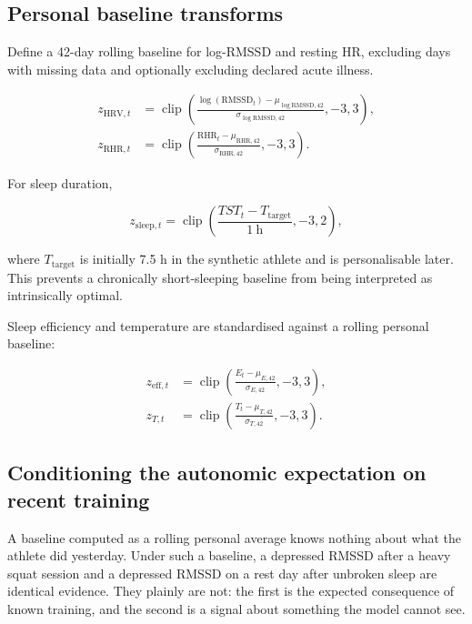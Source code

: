 \documentclass[11pt]{article}
\begin{document}
\subsection{Personal baseline transforms}

Define a 42-day rolling baseline for log-RMSSD and resting HR, excluding days with missing data and optionally excluding declared acute illness.

\begin{align}
z_{\mathrm{HRV},t}&=\operatorname{clip}\left(\frac{\log(\mathrm{RMSSD}_t)-\mu_{\log \mathrm{RMSSD},42}}{\sigma_{\log \mathrm{RMSSD},42}},-3,3\right),\\
z_{\mathrm{RHR},t}&=\operatorname{clip}\left(\frac{\mathrm{RHR}_t-\mu_{\mathrm{RHR},42}}{\sigma_{\mathrm{RHR},42}},-3,3\right).
\end{align}

For sleep duration,

\begin{equation}
z_{\mathrm{sleep},t}=\operatorname{clip}\left(\frac{TST_t-T_{\mathrm{target}}}{1\ \mathrm{h}},-3,2\right),
\end{equation}

where $T_{\mathrm{target}}$ is initially 7.5 h in the synthetic athlete and is personalisable later. This prevents a chronically short-sleeping baseline from being interpreted as intrinsically optimal.

Sleep efficiency and temperature are standardised against a rolling personal baseline:

\begin{align}
z_{\mathrm{eff},t}&=\operatorname{clip}\left(\frac{E_t-\mu_{E,42}}{\sigma_{E,42}},-3,3\right),\\
z_{T,t}&=\operatorname{clip}\left(\frac{T_t-\mu_{T,42}}{\sigma_{T,42}},-3,3\right).
\end{align}

\subsection{Conditioning the autonomic expectation on recent training}
\label{sec:condexp}

A baseline computed as a rolling personal average knows nothing about what the athlete did yesterday. Under such a baseline, a depressed RMSSD after a heavy squat session and a depressed RMSSD on a rest day after unbroken sleep are identical evidence. They plainly are not: the first is the expected consequence of known training, and the second is a signal about something the model cannot see.
\end{document}
